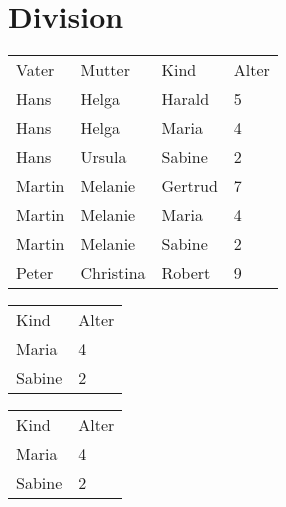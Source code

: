 \documentclass{bschlangaul-aufgabe}
\begin{document}
\section{Division
}


\begin{tabular}{llll}
Vater  & Mutter    & Kind    & Alter \\
Hans   & Helga     & Harald  & 5     \\
Hans   & Helga     & Maria   & 4     \\
Hans   & Ursula    & Sabine  & 2     \\
Martin & Melanie   & Gertrud & 7     \\
Martin & Melanie   & Maria   & 4     \\
Martin & Melanie   & Sabine  & 2     \\
Peter  & Christina & Robert  & 9
\end{tabular}


\begin{tabular}{ll}
Kind   & Alter \\
Maria  & 4     \\
Sabine & 2
\end{tabular}


\begin{tabular}{ll}
Kind   & Alter \\
Maria  & 4     \\
Sabine & 2
\end{tabular}
\end{document}

